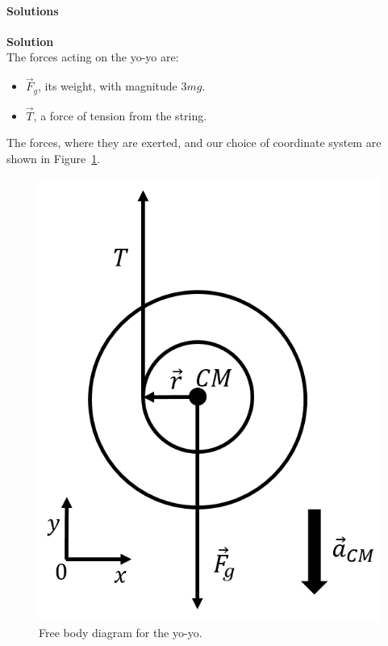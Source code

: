 \paragraph{Solutions}

\begin{framed}
\textbf{Solution}\\
The forces acting on the yo-yo are:

\begin{itemize}
\item $\vec F_g$, its weight, with magnitude $3mg$.
\item $\vec T$, a force of tension from the string.
\end{itemize}

The forces, where they are exerted, and our choice of coordinate system are shown in Figure~\ref{fig:angularmomentumrolling:yoyo_fbd}.

\begin{figure}[!htbp]
\centering
\includegraphics[width=0.3\linewidth]{files/yoyo_fbd-ecc661c3724d09f92dbaf7fbbadd684d.png}
\caption[]{Free body diagram for the yo-yo.}
\label{fig:angularmomentumrolling:yoyo_fbd}
\end{figure}


\end{framed}
